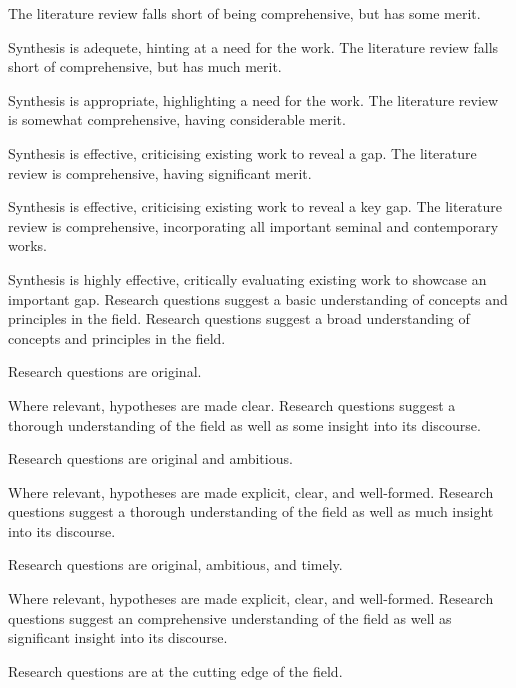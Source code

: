 \documentclass{../fal_assignment}
\begin{document}
\begin{markingrubric}
        \grade \fail 
        	\par 
        \grade The literature review falls short of being comprehensive, but has some merit.
        	\par  Synthesis is adequete, hinting at a need for the work.
        \grade The literature review falls short of comprehensive, but has much merit.
        	\par  Synthesis is appropriate, highlighting a need for the work.
        \grade The literature review is somewhat comprehensive, having considerable merit.
        	\par  Synthesis is effective, criticising existing work to reveal a gap.
        \grade The literature review is comprehensive, having significant merit.
        	\par Synthesis is effective, criticising existing work to reveal a key gap.
        \grade The literature review is comprehensive, incorporating all important seminal and contemporary works.
        	\par Synthesis is highly effective, critically evaluating existing work to showcase an important gap.
            \grade\fail 
        \grade 		Research questions suggest a basic understanding of concepts and principles in the field.
        \grade 		Research questions suggest a broad understanding of concepts and principles in the field.
        \par		Research questions are original.
        \par		Where relevant, hypotheses are made clear.
        \grade 		Research questions suggest a thorough understanding of the field as well as some insight into its discourse.
        \par		Research questions are original and ambitious.
      \par		Where relevant, hypotheses are made explicit, clear, and well-formed.
        \grade 		Research questions suggest a thorough understanding of the field as well as much insight into its discourse.
        \par		Research questions are original, ambitious, and timely.
      \par		Where relevant, hypotheses are made explicit, clear, and well-formed.
        \grade 		Research questions suggest an comprehensive understanding of the field as well as significant insight into its discourse.
        \par		Research questions are at the cutting edge of the field.

\end{markingrubric}
\end{document}
